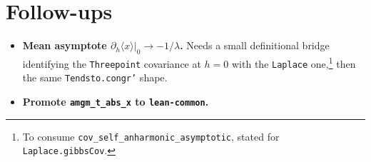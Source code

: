 \documentclass[11pt]{article}
\begin{document}
\section{Follow-ups}

\begin{itemize}[itemsep=3pt]
\item \textbf{Mean asymptote $\partial_h\langle x\rangle|_0\to-1/\lambda$.}
  Needs a small definitional bridge identifying the \texttt{Threepoint}
  covariance at $h=0$ with the \texttt{Laplace} one,\footnote{To consume
  \texttt{cov\_self\_anharmonic\_asymptotic}, stated for \texttt{Laplace.gibbsCov}.}
  then the same \texttt{Tendsto.congr'} shape.
\item \textbf{Promote \texttt{amgm\_t\_abs\_x} to \texttt{lean-common}.}
\end{itemize}
\end{document}
